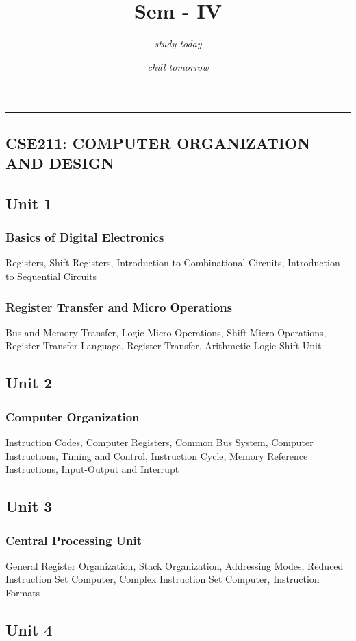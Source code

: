 \documentclass{article}
\title{Sem - IV}
\author{\textit{study today}}
\date{\textit{chill tomorrow}}
\begin{document}
\maketitle
\hrule
\begin{multicols*}{2}
    \section*{CSE211: COMPUTER ORGANIZATION AND DESIGN}
    \subsection*{Unit 1}
    \subsubsection*{Basics of Digital Electronics}
    Registers, Shift Registers, Introduction to Combinational Circuits, Introduction to Sequential Circuits
    \subsubsection*{Register Transfer and Micro Operations}
    Bus and Memory Transfer, Logic Micro Operations, Shift Micro Operations, Register Transfer Language, Register Transfer, Arithmetic Logic Shift Unit
    \subsection*{Unit 2}
    \subsubsection*{Computer Organization}
    Instruction Codes, Computer Registers, Common Bus System, Computer Instructions, Timing and Control, Instruction Cycle, Memory Reference Instructions, Input-Output and Interrupt
    \subsection*{Unit 3}
    \subsubsection*{Central Processing Unit}
    General Register Organization, Stack Organization, Addressing Modes, Reduced Instruction Set Computer, Complex Instruction Set Computer, Instruction Formats
    \subsection*{Unit 4}

\end{multicols*}
\end{document}
